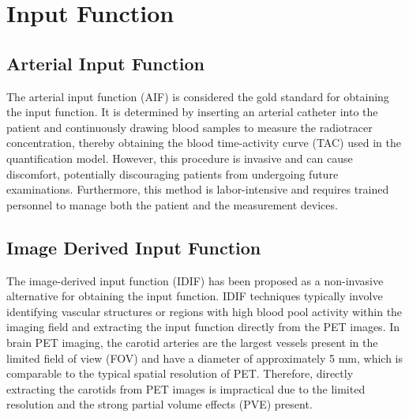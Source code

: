 \section{Input Function}
\subsection{Arterial Input Function}
The arterial input function (AIF) is considered the gold standard for obtaining the input function.
It is determined by inserting an arterial catheter into the patient and continuously drawing blood samples to measure the radiotracer concentration, thereby obtaining the blood time-activity curve (TAC) used in the quantification model.
However, this procedure is invasive and can cause discomfort, potentially discouraging patients from undergoing future examinations.
Furthermore, this method is labor-intensive and requires trained personnel to manage both the patient and the measurement devices.

\subsection{Image Derived Input Function}
The image-derived input function (IDIF) has been proposed as a non-invasive alternative for obtaining the input function.
IDIF techniques typically involve identifying vascular structures or regions with high blood pool activity within the imaging field and extracting the input function directly from the PET images.
In brain PET imaging, the carotid arteries are the largest vessels present in the limited field of view (FOV) and have a diameter of approximately 5 mm, which is comparable to the typical spatial resolution of PET.
Therefore, directly extracting the carotids from PET images is impractical due to the limited resolution and the strong partial volume effects (PVE) present.


